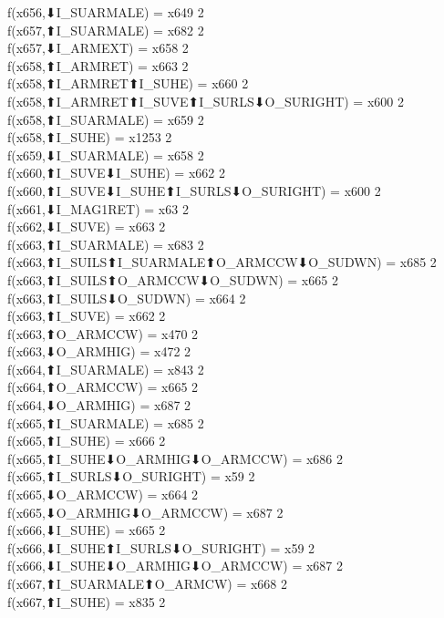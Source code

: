 f(x656,⬇I_SUARMALE) = x649 {2} \\
f(x657,⬆I_SUARMALE) = x682 {2} \\
f(x657,⬇I_ARMEXT) = x658 {2} \\
f(x658,⬆I_ARMRET) = x663 {2} \\
f(x658,⬆I_ARMRET⬆I_SUHE) = x660 {2} \\
f(x658,⬆I_ARMRET⬆I_SUVE⬆I_SURLS⬇O_SURIGHT) = x600 {2} \\
f(x658,⬆I_SUARMALE) = x659 {2} \\
f(x658,⬆I_SUHE) = x1253 {2} \\
f(x659,⬇I_SUARMALE) = x658 {2} \\
f(x660,⬆I_SUVE⬇I_SUHE) = x662 {2} \\
f(x660,⬆I_SUVE⬇I_SUHE⬆I_SURLS⬇O_SURIGHT) = x600 {2} \\
f(x661,⬇I_MAG1RET) = x63 {2} \\
f(x662,⬇I_SUVE) = x663 {2} \\
f(x663,⬆I_SUARMALE) = x683 {2} \\
f(x663,⬆I_SUILS⬆I_SUARMALE⬆O_ARMCCW⬇O_SUDWN) = x685 {2} \\
f(x663,⬆I_SUILS⬆O_ARMCCW⬇O_SUDWN) = x665 {2} \\
f(x663,⬆I_SUILS⬇O_SUDWN) = x664 {2} \\
f(x663,⬆I_SUVE) = x662 {2} \\
f(x663,⬆O_ARMCCW) = x470 {2} \\
f(x663,⬇O_ARMHIG) = x472 {2} \\
f(x664,⬆I_SUARMALE) = x843 {2} \\
f(x664,⬆O_ARMCCW) = x665 {2} \\
f(x664,⬇O_ARMHIG) = x687 {2} \\
f(x665,⬆I_SUARMALE) = x685 {2} \\
f(x665,⬆I_SUHE) = x666 {2} \\
f(x665,⬆I_SUHE⬇O_ARMHIG⬇O_ARMCCW) = x686 {2} \\
f(x665,⬆I_SURLS⬇O_SURIGHT) = x59 {2} \\
f(x665,⬇O_ARMCCW) = x664 {2} \\
f(x665,⬇O_ARMHIG⬇O_ARMCCW) = x687 {2} \\
f(x666,⬇I_SUHE) = x665 {2} \\
f(x666,⬇I_SUHE⬆I_SURLS⬇O_SURIGHT) = x59 {2} \\
f(x666,⬇I_SUHE⬇O_ARMHIG⬇O_ARMCCW) = x687 {2} \\
f(x667,⬆I_SUARMALE⬆O_ARMCW) = x668 {2} \\
f(x667,⬆I_SUHE) = x835 {2} \\
